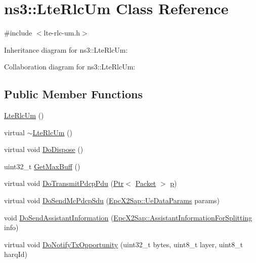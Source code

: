 \hypertarget{classns3_1_1LteRlcUm}{}\section{ns3\+:\+:Lte\+Rlc\+Um Class Reference}
\label{classns3_1_1LteRlcUm}


{\ttfamily \#include $<$lte-\/rlc-\/um.\+h$>$}



Inheritance diagram for ns3\+:\+:Lte\+Rlc\+Um\+:


Collaboration diagram for ns3\+:\+:Lte\+Rlc\+Um\+:
\subsection*{Public Member Functions}
\begin{DoxyCompactItemize}
\item 
\hyperlink{classns3_1_1LteRlcUm_a04e9e432afa6587ef18dbdb41ebf2abd}{Lte\+Rlc\+Um} ()
\item 
virtual \hyperlink{classns3_1_1LteRlcUm_a29932c4ed627ca0e1fa487589d22dbd3}{$\sim$\+Lte\+Rlc\+Um} ()
\item 
virtual void \hyperlink{classns3_1_1LteRlcUm_ab83530e049aa5ff2a3a4dfdbf697d73a}{Do\+Dispose} ()
\item 
uint32\+\_\+t \hyperlink{classns3_1_1LteRlcUm_a67fe0e4cb826063abc9fbd30f651170a}{Get\+Max\+Buff} ()
\item 
virtual void \hyperlink{classns3_1_1LteRlcUm_ac7e23317792e8464ac9feafdcd7e1f74}{Do\+Transmit\+Pdcp\+Pdu} (\hyperlink{classns3_1_1Ptr}{Ptr}$<$ \hyperlink{classns3_1_1Packet}{Packet} $>$ \hyperlink{lte__link__budget__x2__handover__measures_8m_ac9de518908a968428863f829398a4e62}{p})
\item 
virtual void \hyperlink{classns3_1_1LteRlcUm_a50ee369eab559444208977e53b926027}{Do\+Send\+Mc\+Pdcp\+Sdu} (\hyperlink{structns3_1_1EpcX2Sap_1_1UeDataParams}{Epc\+X2\+Sap\+::\+Ue\+Data\+Params} params)
\item 
void \hyperlink{classns3_1_1LteRlcUm_a982377231676cdfa87ac26a4c182f239}{Do\+Send\+Assistant\+Information} (\hyperlink{structns3_1_1EpcX2Sap_1_1AssistantInformationForSplitting}{Epc\+X2\+Sap\+::\+Assistant\+Information\+For\+Splitting} info)
\item 
virtual void \hyperlink{classns3_1_1LteRlcUm_a54a1abae2b97a8a060bc42b6abbf3af4}{Do\+Notify\+Tx\+Opportunity} (uint32\+\_\+t bytes, uint8\+\_\+t layer, uint8\+\_\+t harq\+Id)
\item 

\end{DoxyCompactItemize}
